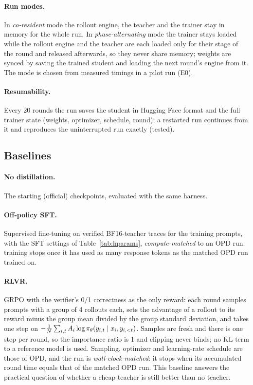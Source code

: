 \paragraph{Run modes.} In \emph{co-resident} mode the rollout engine, the teacher and the
trainer stay in memory for the whole run. In \emph{phase-alternating} mode the trainer stays
loaded while the rollout engine and the teacher are each loaded only for their stage of the round
and released afterwards, so they never share memory; weights are synced by saving the trained
student and loading the next round's engine from it. The mode is chosen from measured timings in
a pilot run (E0). \TBD{} 

\paragraph{Resumability.} Every 20 rounds the run saves the student in Hugging Face format and
the full trainer state (weights, optimizer, schedule, round); a restarted run continues from it
and reproduces the uninterrupted run exactly (tested).



\subsection{Baselines}
\paragraph{No distillation.} The starting (official) checkpoints, evaluated with the same harness.

\paragraph{Off-policy SFT.} Supervised fine-tuning on verified BF16-teacher traces for the
training prompts, with the SFT settings of Table~\ref{tab:hparams}, \emph{compute-matched} to an OPD run: training
stops once it has used as many response tokens as the matched OPD run trained on.

\paragraph{RLVR.} GRPO \citep{shao2024grpo} with the verifier's 0/1 correctness as the only
reward: each round samples \nPrompts{} prompts with a group of 4 rollouts each, sets the
advantage of a rollout to its reward minus the group mean divided by the group standard deviation,
and takes one step on $-\frac{1}{N}\sum_{i,t} A_i \log\pi_\theta(y_{i,t}\mid x_i,y_{i,<t})$. Samples are
fresh and there is one step per round, so the importance ratio is 1 and clipping never binds; no
KL term to a reference model is used. Sampling, optimizer and learning-rate schedule are those
of OPD, and the run is \emph{wall-clock-matched}: it stops when its accumulated round time equals
that of the matched OPD run. This baseline answers the practical question of whether a cheap
teacher is still better than no teacher.

